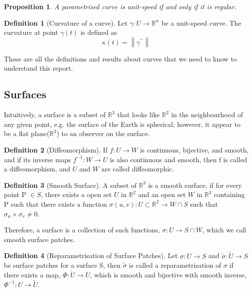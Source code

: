 \documentclass{article}
\theoremstyle{plain}
\newtheorem{proposition}{Proposition}
\theoremstyle{definition}
\newtheorem{definition}{Definition}
\theoremstyle{remark}
\newcommand{\R}{\mathbb{R}}
\begin{document}
\begin{proposition}
    A parametrised curve is unit-speed if and only if it is regular.
\end{proposition}

\begin{definition}[Curvature of a curve] \label{definition: Curvature of a curve}
    Let \( \gamma: U \rightarrow \R^n \) be a unit-speed curve. The curvature at point \( \gamma(t) \) is defined as \[ \kappa(t) = \left\lVert \gamma^{\prime\prime} \right\rVert  \]
\end{definition}

These are all the definitions and results about curves that we need to know to understand this report.
\subsection{Surfaces}
Intuitively, a surface is a subset of \( \R^3 \) that looks like \( \R^2 \)  in the neighbourhood of any given point, e.g. the surface of the Earth is spherical; however, it appear to be a flat plane(\( \R^2 \)) to an observer on the surface.

\begin{definition}[Diffeomorphism]
    If \( f: U \rightarrow W \) is continuous, bijective, and smooth, and if its inverse maps \( f^{-1}: W \rightarrow U\) is also continuous and smooth, then f is called a diffeomorphism, and \(U\) and \(W\) are called diffeomorphic.
\end{definition}

\begin{definition}[Smooth Surface]
    A subset of \( \R^3 \) is a smooth surface, if for every point P \( \in S \), there exists a open set \( U \text{ in } \R^2\) and an open set \( W \text{ in } \R^3\) containing P such that there exists a function \( \sigma(u,v): U \subset \R^2 \rightarrow W \cap S \) such that \( \sigma_u \times \sigma_v \neq 0\). 
\end{definition}

Therefore, a surface is a collection of such functions, \( \sigma: U \rightarrow S \cap W \), which we call smooth surface patches.

\begin{definition}[Reparametrisation of Surface Patches]
    Let \( \sigma: U \rightarrow S\) and \( \tilde{\sigma}: \tilde{U} \rightarrow S\) be surface patches for a surface S, then \( \tilde{\sigma} \) is called a reparametrisation of \( \sigma \) if there exists a map, \( \Phi: \tilde{U} \rightarrow U \), which is smooth and bijective with smooth inverse, \( \Phi^{-1}: U \rightarrow \tilde{U} \).
\end{definition}
\end{document}
